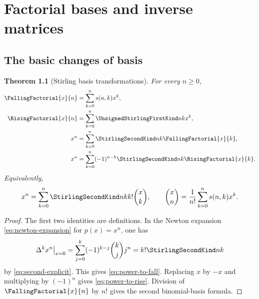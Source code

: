 \documentclass[11pt,a4paper,oneside,openany]{book}
\newtheorem{theorem}{Theorem}[chapter]
\theoremstyle{definition}
\theoremstyle{remark}
\begin{document}
\chapter{Factorial bases and inverse matrices}
\label{ch:bases}

\section{The basic changes of basis}
\begin{theorem}[Stirling basis transformations]\label{thm:stirling-basis}
For every $n\ge0$,
\begin{align}
 \FallingFactorial{x}{n}&=\sum_{k=0}^ns(n,k)x^k,\label{eq:fall-to-power}\\
 \RisingFactorial{x}{n}&=\sum_{k=0}^n\UnsignedStirlingFirstKind nkx^k,\label{eq:rise-to-power}\\
 x^n&=\sum_{k=0}^n\StirlingSecondKind nk\FallingFactorial{x}{k},\label{eq:power-to-fall}\\
 x^n&=\sum_{k=0}^n(-1)^{n-k}\StirlingSecondKind nk\RisingFactorial{x}{k}.\label{eq:power-to-rise}
\end{align}
Equivalently,
\begin{equation}\label{eq:binomial-basis}
 x^n=\sum_{k=0}^n\StirlingSecondKind nk k!\binom{x}{k},\qquad
 \binom{x}{n}=\frac1{n!}\sum_{k=0}^ns(n,k)x^k.
\end{equation}
\end{theorem}
\begin{proof}
The first two identities are definitions.  In the Newton expansion
\cref{eq:newton-expansion} for $p(x)=x^n$, one has
\[
 \Delta^kx^n\big|_{x=0}=\sum_{j=0}^k(-1)^{k-j}\binom kjj^n
 =k!\StirlingSecondKind nk
\]
by \cref{eq:second-explicit}.  This gives \cref{eq:power-to-fall}.  Replacing $x$
by $-x$ and multiplying by $(-1)^n$ gives \cref{eq:power-to-rise}.  Division of
$\FallingFactorial{x}{n}$ by $n!$ gives the second binomial-basis formula.
\end{proof}
\end{document}
